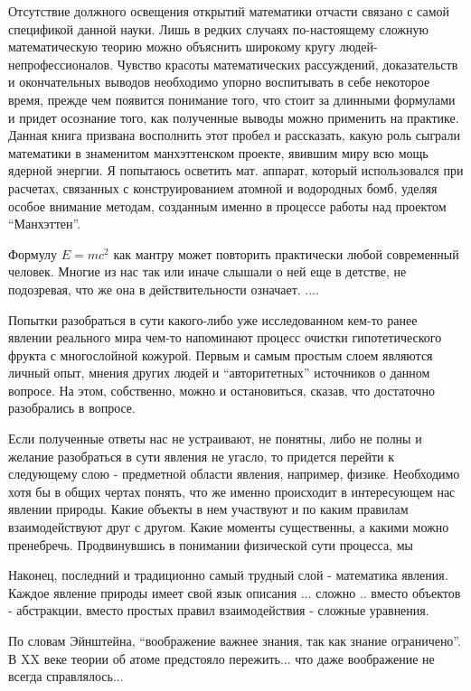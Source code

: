 Отсутствие должного освещения открытий математики отчасти связано с самой спецификой данной науки. Лишь в редких случаях по-настоящему сложную математическую теорию можно объяснить широкому кругу людей-непрофессионалов. Чувство красоты математических рассуждений, доказательств и окончательных выводов необходимо упорно воспитывать в себе некоторое время, прежде чем появится понимание того, что стоит за длинными формулами и придет осознание того, как полученные выводы можно применить на практике.
Данная книга призвана восполнить этот пробел и рассказать, какую роль сыграли математики в знаменитом манхэттенском проекте, явившим миру всю мощь ядерной энергии. Я попытаюсь осветить мат. аппарат, который использовался при расчетах, связанных с конструированием атомной и водородных бомб, уделяя особое внимание методам, созданным именно в процессе работы над проектом “Манхэттен”.



Формулу $E = mc^2$ как мантру может повторить практически любой современный человек.
Многие из нас так или иначе слышали о ней еще в детстве, не подозревая, что же она в действительности означает.
....


Попытки разобраться в сути какого-либо уже исследованном кем-то ранее явлении реального мира чем-то напоминают процесс очистки гипотетического фрукта с многослойной кожурой.
Первым и самым простым слоем являются личный опыт, мнения других людей и ``авторитетных'' источников о данном вопросе. 
На этом, собственно, можно и остановиться, сказав, что достаточно разобрались в вопросе.

Если полученные ответы нас не устраивают, не понятны, либо не полны и желание разобраться в сути явления не угасло, то придется перейти к следующему слою - предметной области явления, например, физике.
Необходимо хотя бы в общих чертах понять, что же именно происходит в интересующем нас явлении природы. 
Какие объекты в нем участвуют и по каким правилам взаимодействуют друг с другом. Какие моменты существенны, а какими можно пренебречь.
Продвинувшись в понимании физической сути процесса, мы 

Наконец, последний и традиционно самый трудный слой - математика явления.
Каждое явление природы имеет свой язык описания  ...  сложно .. вместо объектов - абстракции, вместо простых правил взаимодействия - сложные уравнения.





По словам Эйнштейна, ``воображение важнее знания, так как знание ограничено''.
В XX веке теории об атоме предстояло пережить... что даже воображение не всегда справлялось...


